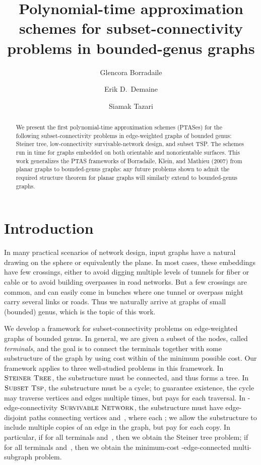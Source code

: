\documentclass{article}
\newcommand{\myproblemname}[1]{\ensuremath{\mbox{\sc #1}}\xspace}
\newcommand{\steiner}{\myproblemname{Steiner Tree}}
\newcommand{\subtsp}{\myproblemname{Subset Tsp}}
\newcommand{\survive}{\myproblemname{Survivable Network}}
\begin{document}
\title{Polynomial-time approximation schemes for subset-connectivity
    problems in bounded-genus graphs}



\author{Glencora Borradaile \and
        Erik D.\ Demaine \and
        Siamak Tazari
}









\maketitle

\begin{abstract}
  We present the first polynomial-time approximation schemes (PTASes)
  for the following subset-connectivity problems in edge-weighted
  graphs of bounded genus: Steiner tree, low-connectivity
  survivable-network design, and subset TSP.  The schemes run in  time for graphs embedded on both orientable and
  nonorientable surfaces.  This work generalizes the PTAS frameworks
  of Borradaile, Klein, and Mathieu (2007) from
  planar graphs to bounded-genus graphs: any future problems shown to
  admit the required structure theorem for planar graphs will
  similarly extend to bounded-genus graphs.
\end{abstract}




\section{Introduction}

In many practical scenarios of network design, input graphs
have a natural drawing on the sphere or equivalently the plane.
In most cases, these embeddings have few crossings, either to avoid digging
multiple levels of tunnels for fiber or cable or to avoid building overpasses
in road networks.  But a few crossings are common, and can easily come in
bunches where one tunnel or overpass might carry several links or roads.
Thus we naturally arrive at graphs of small (bounded) genus,
which is the topic of this work.

We develop a  framework for subset-connectivity problems on
edge-weighted graphs of bounded genus.  In general, we are given a
subset of the nodes, called \emph{terminals}, and the goal is to
connect the terminals together with some substructure of the graph by
using cost within  of the minimum possible cost.  Our
framework applies to three well-studied problems in this framework.
In \steiner, the substructure must be connected, and thus forms a
tree.  In \subtsp, the substructure must be a cycle; to guarantee
existence, the cycle may traverse vertices and edges multiple times,
but pays for each traversal.  In -edge-connectivity
\survive, the substructure must have  edge-disjoint
paths connecting vertices  and~, where each ; we allow the substructure to include multiple copies of an
edge in the graph, but pay for each copy.  In particular, if 
for all terminals  and~, then we obtain the Steiner tree
problem; if  for all terminals  and~, then we obtain
the minimum-cost -edge-connected multi-subgraph problem.
\end{document}
